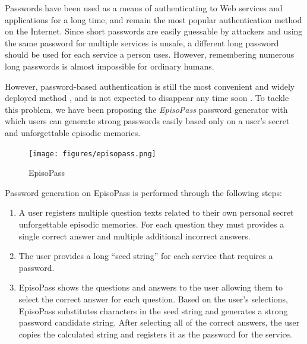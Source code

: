 \documentclass[sigconf]{acmart}
\begin{document}
Passwords have been used as a means of authenticating to Web services
and applications for a long time, and remain the most popular
authentication method on the Internet.
Since short passwords are easily guessable by attackers and using the
same password for multiple services is unsafe, a different long
password should be used for each service a person uses.
However, remembering numerous long passwords is almost impossible for
ordinary humans.

However, password-based authentication is still the most convenient
and widely deployed method \cite{Bonneau:ReplacePasswords}, and is not
expected to disappear any time soon \cite{Herley:2009:PSS:1601990.1602010}.
%
To tackle this problem,
we have been proposing the \textit{EpisoPass} password generator with which 
users can generate strong passwords easily
based only on a user's secret and unforgettable episodic memories.


\begin{figure}[H]
  \centerline{\texttt{[image: figures/episopass.png]}}
  \caption{EpisoPass}
  \label{EpisoPass}
\end{figure}

Password generation on EpisoPass is performed through the following steps:

\begin{enumerate}
\item A user registers multiple question texts related to their own personal
secret unforgettable episodic memories. For each question they must provides
a single correct answer and multiple additional incorrect answers.

\item The user provides a long ``seed string'' for each service that requires
a password.

\item EpisoPass shows the questions and answers to the user allowing
them to select the correct answer for each question.
Based on the user's selections,
EpisoPass substitutes characters in the seed string and generates a
strong password candidate string.
After selecting all of the correct answers,
the user copies the calculated string
and registers it as the password for the service.
\end{enumerate}
\end{document}
